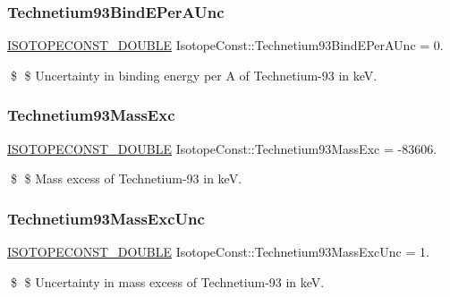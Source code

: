 \subsubsection{\texorpdfstring{Technetium93\+Bind\+E\+Per\+A\+Unc}{Technetium93BindEPerAUnc}}
{\footnotesize\ttfamily \mbox{\hyperlink{group___isotope_const-_macros_ga8f45a7272ce02c0b4c65c44636ed719a}{I\+S\+O\+T\+O\+P\+E\+C\+O\+N\+S\+T\+\_\+\+D\+O\+U\+B\+LE}} Isotope\+Const\+::\+Technetium93\+Bind\+E\+Per\+A\+Unc = 0.}

\$ \$ Uncertainty in binding energy per A of Technetium-\/93 in keV. \mbox{\label{group___isotope_const-_technetium-_tc93_gaf111bf657a6cfb8ea43e5a3fef315f92}} 
\subsubsection{\texorpdfstring{Technetium93\+Mass\+Exc}{Technetium93MassExc}}
{\footnotesize\ttfamily \mbox{\hyperlink{group___isotope_const-_macros_ga8f45a7272ce02c0b4c65c44636ed719a}{I\+S\+O\+T\+O\+P\+E\+C\+O\+N\+S\+T\+\_\+\+D\+O\+U\+B\+LE}} Isotope\+Const\+::\+Technetium93\+Mass\+Exc = -\/83606.}

\$ \$ Mass excess of Technetium-\/93 in keV. \mbox{\label{group___isotope_const-_technetium-_tc93_ga592db7cea9049ca6cbf7423457856f6f}} 
\subsubsection{\texorpdfstring{Technetium93\+Mass\+Exc\+Unc}{Technetium93MassExcUnc}}
{\footnotesize\ttfamily \mbox{\hyperlink{group___isotope_const-_macros_ga8f45a7272ce02c0b4c65c44636ed719a}{I\+S\+O\+T\+O\+P\+E\+C\+O\+N\+S\+T\+\_\+\+D\+O\+U\+B\+LE}} Isotope\+Const\+::\+Technetium93\+Mass\+Exc\+Unc = 1.}

\$ \$ Uncertainty in mass excess of Technetium-\/93 in keV. \mbox{\label{group___isotope_const-_technetium-_tc93_ga25fe38844b61c08af17c236afd3ec532}} 
